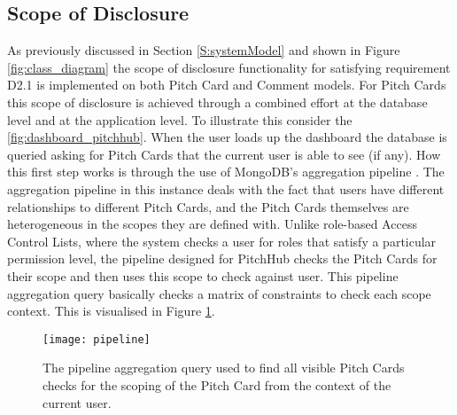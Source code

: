 \subsection{Scope of Disclosure}
As previously discussed in Section \ref{S:systemModel} and shown in Figure \ref{fig:class_diagram} the scope of disclosure functionality for satisfying requirement D2.1 is implemented on both Pitch Card and Comment models. For Pitch Cards this scope of disclosure is achieved through a combined effort at the database level and at the application level. To illustrate this consider the \ref{fig:dashboard_pitchhub}. When the user loads up the dashboard the database is queried asking for Pitch Cards that the current user is able to see (if any). How this first step works is through the use of MongoDB's aggregation pipeline \cite{Aggre7:online}. The aggregation pipeline in this instance deals with the fact that users have different relationships to different Pitch Cards, and the Pitch Cards themselves are heterogeneous in the scopes they are defined with. Unlike role-based Access Control Lists, where the system checks a user for roles that satisfy a particular permission level, the pipeline designed for PitchHub checks the Pitch Cards for their scope and then uses this scope to check against user. This pipeline aggregation query basically checks a matrix of constraints to check each scope context. This is visualised in Figure \ref{fig:pipeline}.

\begin{figure}[ht]
    \centering
    \texttt{[image: pipeline]}
    \caption{The pipeline aggregation query used to find all visible Pitch Cards checks for the scoping of the Pitch Card from the context of the current user.}
    \label{fig:pipeline}
\end{figure}


